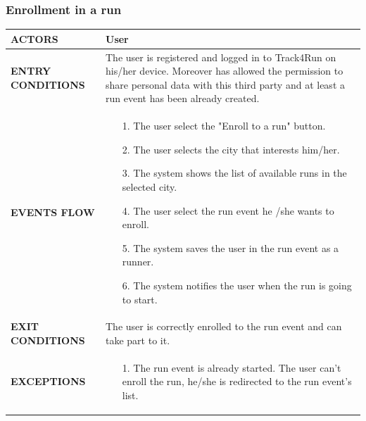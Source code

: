 \documentclass[a4paper]{article}
\begin{document}
\subsubsection{Enrollment in a run}
\begin{center}
    \begin{tabular}{l || p{8cm} ||}
        \bf{ACTORS} & User \\ \hline
        \bf{ENTRY CONDITIONS} & The user is registered and logged in to Track4Run on his/her device. Moreover has allowed the permission to share personal data with this third party and at least a run event has been already created. \\ \hline
        \bf{EVENTS FLOW} & \begin{itemize}[noitemsep, topsep=0cm, leftmargin=*] \vspace{-0.2cm}
            \item[1.] The user select the "Enroll to a run" button.
            \item[2.] The user selects the city that interests him/her.
            \item[3.] The system shows the list of available runs in the selected city.
            \item[4.] The user select the run event he /she wants to enroll.
            \item[5.] The system saves the user in the run event as a runner.
            \item[6.] The system notifies the user when the run is going to start.
        \end{itemize}
        \\ \hline
        \bf{EXIT CONDITIONS} & The user is correctly enrolled to the run event and can take part to it. \\ \hline
        \bf{EXCEPTIONS} & \begin{itemize}[noitemsep, topsep=0cm, leftmargin=*] \vspace{-0.2cm}
            \item[1.] The run event is already started. The user can't enroll the run, he/she is redirected to the run event's list.
        \end{itemize}
        \\ \hline \hline
    \end{tabular}
\end{center}

\vspace{1cm}
\end{document}
